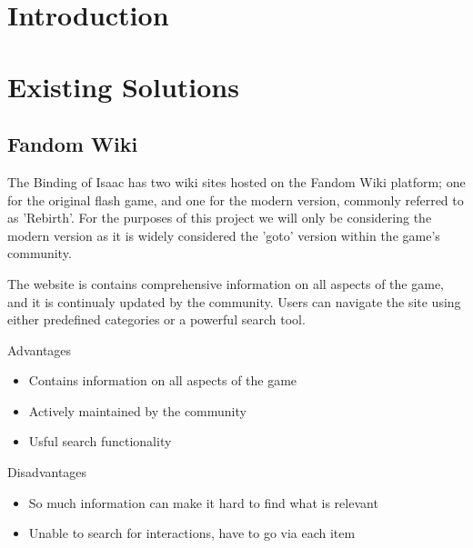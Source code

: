 \section{Introduction}
\section{Existing Solutions}
\subsection*{Fandom Wiki}
The Binding of Isaac has two wiki sites hosted on the Fandom Wiki platform; one for the original flash 
game\cite{BindingIsaacWiki}, and one for the modern version, commonly referred to as 'Rebirth'\cite{BindingIsaacRebirth}.
For the purposes of this project we will only be considering the modern version as it is widely considered the 'goto' 
version within the game's community.\par The website is contains comprehensive information on all aspects of the game, 
and it is continualy updated by the community. Users can navigate the site using either predefined categories or a 
powerful search tool. \par
Advantages
\begin{itemize}
    \item Contains information on all aspects of the game
    \item Actively maintained by the community
    \item Usful search functionality
\end{itemize}
Disadvantages
\begin{itemize}
    \item So much information can make it hard to find what is relevant
    \item Unable to search for interactions, have to go via each item 
\end{itemize}
